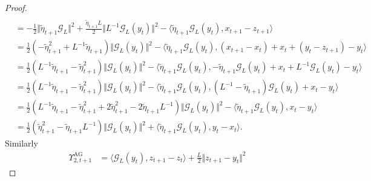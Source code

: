 \begin{proof}
\begin{align*}
            \\
            &= 
            - \frac{1}{2}\Vert \tilde\eta_{t + 1} \mathcal G_L\Vert^2 + 
            \frac{\tilde\eta_{t + 1}L}{2}\Vert L^{-1} \mathcal G_L(y_t)\Vert^2
            - 
            \langle \tilde\eta_{t + 1} \mathcal G_L(y_t), x_{t + 1} - z_{t + 1} \rangle
            \\
            &= 
            \frac{1}{2}\left(
                - \tilde\eta_{t + 1}^2 + 
                L^{-1}\tilde\eta_{t + 1}
            \right)\Vert \mathcal G_L(y_t)\Vert^2
            - 
            \langle 
                \tilde\eta_{t + 1} \mathcal G_L(y_t), 
                (x_{t + 1} - x_{t}) + x_t
                + (y_t - z_{t + 1}) - y_t
            \rangle
            \\
            &= 
            \frac{1}{2}\left(
                L^{-1}\tilde\eta_{t + 1}
                - \tilde\eta_{t + 1}^2
            \right)\Vert \mathcal G_L(y_t)\Vert^2
            - 
            \langle 
                \tilde\eta_{t + 1} \mathcal G_L(y_t), 
                -\tilde\eta_{t + 1}\mathcal G_L(y_t) + x_t 
                + L^{-1}\mathcal G_L(y_t) - y_t
            \rangle
            \\
            &= 
            \frac{1}{2}\left(
                L^{-1}\tilde\eta_{t + 1}
                - \tilde\eta_{t + 1}^2
            \right)\Vert \mathcal G_L(y_t)\Vert^2
            - \langle 
                \tilde\eta_{t +1}\mathcal G_L(y_t), 
                (L^{-1} - \tilde\eta_{t + 1})\mathcal G_L(y_t) + x_t - y_t
            \rangle
            \\
            &= \frac{1}{2}\left(
                L^{-1}\tilde\eta_{t + 1} - \tilde\eta_{t + 1}^2 
                + 2 \tilde\eta_{t + 1}^2 - 2\tilde\eta_{t + 1}L^{-1}
            \right)\Vert \mathcal G_L(y_t)\Vert^2
            - 
            \langle 
                \tilde\eta_{t + 1} \mathcal G_L(y_t), 
                x_t - y_t
            \rangle
            \\
            &= 
            \frac{1}{2}\left(
                \tilde\eta_{t + 1}^2 - \tilde\eta_{t + 1}L^{-1}
            \right)\Vert \mathcal G_L(y_t)\Vert^2 
            + \langle \tilde\eta_{t + 1} \mathcal G_L(y_t), y_t - x_t\rangle.
        \end{align*}
        Similarly 
        \begin{align*}
            \Upsilon_{2, t + 1}^{\text{AG}} 
            &= 
            \langle \mathcal G_L(y_t), z_{t + 1} - z_t\rangle + 
            \frac{L}{2}\Vert z_{t + 1} - y_t\Vert^2

\end{align*}
\end{proof}
